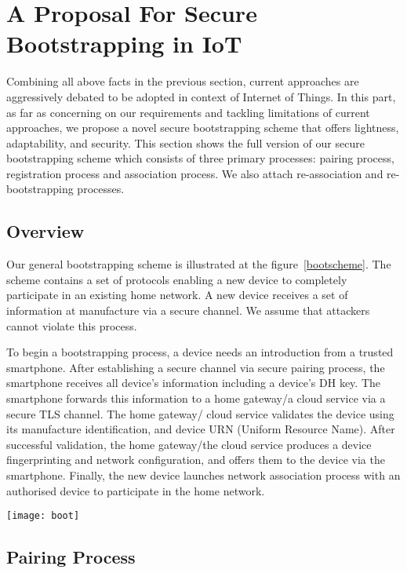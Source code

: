 \section{A Proposal For Secure Bootstrapping in IoT}\label{proposal}

Combining all above facts in the previous section, current approaches are aggressively debated to be adopted in context of Internet of Things. In this part, as far as concerning on our requirements and tackling limitations of current approaches, we propose a novel secure bootstrapping scheme that offers lightness, adaptability,  and security. This section shows the full version of our secure bootstrapping scheme which consists of three primary processes: pairing process, registration process and association process. We also attach re-association and re-bootstrapping processes.
 
\subsection{Overview}

Our general bootstrapping scheme is illustrated at the figure~\ref{bootscheme}. The scheme contains a set of protocols enabling a new device to completely participate in an existing home network. A new device receives a set of information at manufacture via a secure channel. We assume that attackers cannot violate this process. 

To begin a bootstrapping process, a device needs an introduction from a trusted smartphone. After establishing a secure channel via secure pairing process, the smartphone receives all device's information including a device's DH key. The smartphone forwards this information to a home gateway/a cloud service via a secure TLS channel. The home gateway/ cloud service validates the device using its manufacture identification, and device URN (Uniform Resource Name). After successful validation, the home gateway/the cloud service produces a device fingerprinting and network configuration, and offers them to the device via the smartphone. Finally, the new device launches network association process with an authorised device to participate in the home network. 

\begin{figure*}
  \centering
  \texttt{[image: boot]}
  \caption{Secure Bootstrapping Scheme}
  \label{bootscheme}
\end{figure*}

\subsection{Pairing Process}

